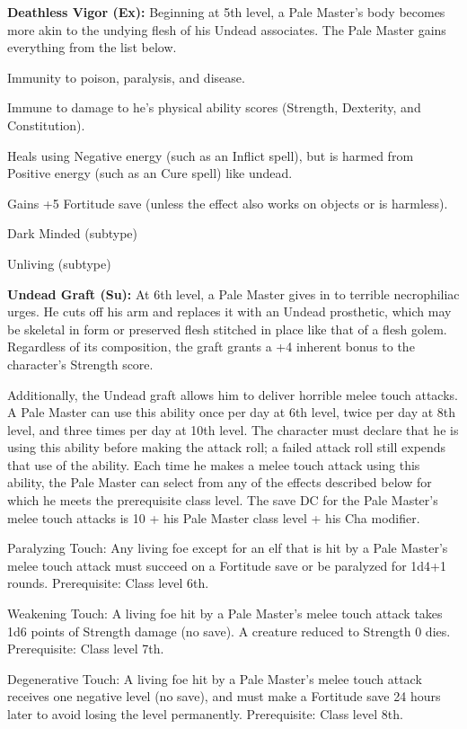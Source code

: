 \textbf{Deathless Vigor (Ex):} Beginning at 5th level, a Pale Master’s body becomes more akin to the undying flesh of his Undead associates. The Pale Master gains everything from the list below.
\begin{itemize*}
\item Immunity to poison, paralysis, and disease.
\item Immune to damage to he's physical ability scores (Strength, Dexterity, and Constitution).
\item Heals using Negative energy (such as an Inflict spell), but is harmed from Positive energy (such as an Cure spell) like undead.
\item Gains +5 Fortitude save (unless the effect also works on objects or is harmless).
\item Dark Minded (subtype)
\item Unliving (subtype)
\end{itemize*}

\textbf{Undead Graft (Su):} At 6th level, a Pale Master gives in to terrible necrophiliac urges. He cuts off his arm and replaces it with an Undead prosthetic, which may be skeletal in form or preserved flesh stitched in place like that of a flesh golem. Regardless of its composition, the graft grants a +4 inherent bonus to the character’s Strength score.

Additionally, the Undead graft allows him to deliver horrible melee touch attacks. A Pale Master can use this ability once per day at 6th level, twice per day at 8th level, and three times per day at 10th level. The character must declare that he is using this ability before making the attack roll; a failed attack roll still expends that use of the ability. Each time he makes a melee touch attack using this ability, the Pale Master can select from any of the effects described below for which he meets the prerequisite class level. The save DC for the Pale Master’s melee touch attacks is 10 + his Pale Master class level + his Cha modifier.

Paralyzing Touch: Any living foe except for an elf that is hit by a Pale Master’s melee touch attack must succeed on a Fortitude save or be paralyzed for 1d4+1 rounds. Prerequisite: Class level 6th.

Weakening Touch: A living foe hit by a Pale Master’s melee touch attack takes 1d6 points of Strength damage (no save). A creature reduced to Strength 0 dies. Prerequisite: Class level 7th.

Degenerative Touch: A living foe hit by a Pale Master’s melee touch attack receives one negative level (no save), and must make a Fortitude save 24 hours later to avoid losing the level permanently. Prerequisite: Class level 8th.

